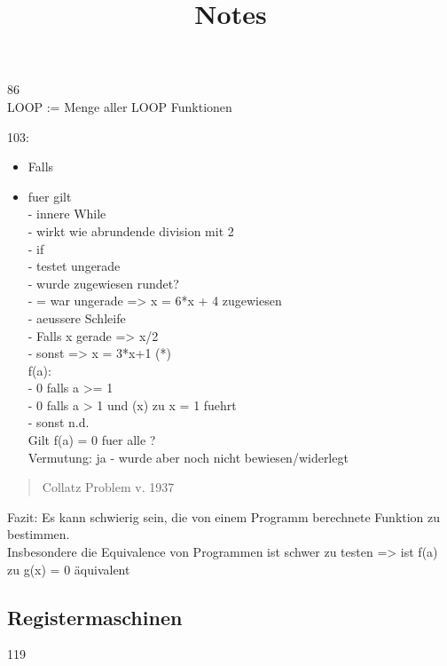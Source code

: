 \documentclass[
]{article}
\title{Notes}
\author{}
\date{}
\providecommand{\tightlist}{%
  \setlength{\itemsep}{0pt}\setlength{\parskip}{0pt}}
\begin{document}
\maketitle

86\\
LOOP := Menge aller LOOP Funktionen

103:

\begin{itemize}
\tightlist
\item
  Falls {}
\item
  fuer {} gilt\\
  - innere While\\
  - wirkt wie abrundende division mit 2\\
  - if\\
  - testet ungerade\\
  - wurde zugewiesen rundet?\\
  - = war {} ungerade =\textgreater{} x = 6*x + 4 zugewiesen\\
  - aeussere Schleife\\
  - Falls x gerade =\textgreater{} x/2\\
  - sonst =\textgreater{} x = 3*x+1 (*)\\
  f(a):\\
  - 0 falls a \textgreater= 1\\
  - 0 falls a \textgreater{} 1 und (x) zu x = 1 fuehrt\\
  - sonst n.d.\\
  Gilt f(a) = 0 fuer alle {}?\\
  Vermutung: ja - wurde aber noch nicht bewiesen/widerlegt
\end{itemize}

\begin{quote}
Collatz Problem v. 1937
\end{quote}

Fazit: Es kann schwierig sein, die von einem Programm berechnete
Funktion zu bestimmen.\\
Insbesondere die Equivalence von Programmen ist schwer zu testen
=\textgreater{} ist f(a) zu g(x) = 0 äquivalent

\subsection{Registermaschinen}\label{registermaschinen}

119
\end{document}
